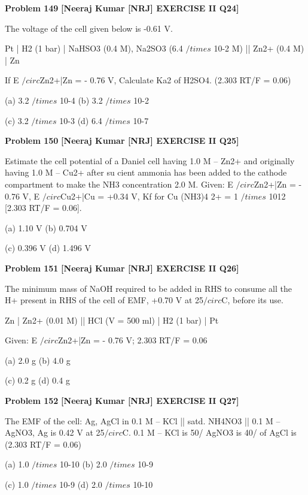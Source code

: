 \begin{problembox}
\textbf{Problem 149} \hfill \textbf{[Neeraj Kumar [NRJ] EXERCISE II Q24]}
\label{q:ext-nrj_all_questions-149}

The voltage of the cell given below is -0.61 V.
 
   Pt | H2 (1 bar) | NaHSO3 (0.4 M), Na2SO3 
(6.4 $/times$ 10-2 M) || Zn2+ (0.4 M) | Zn
 
  If E $/circ$Zn2+|Zn = - 0.76 V, Calculate Ka2 of H2SO4. 
(2.303 RT/F = 0.06)
 
 (a) 3.2 $/times$ 10-4 
(b) 3.2 $/times$ 10-2
 
 (c) 3.2 $/times$ 10-3 
(d) 6.4 $/times$ 10-7
\end{problembox}

\begin{problembox}
\textbf{Problem 150} \hfill \textbf{[Neeraj Kumar [NRJ] EXERCISE II Q25]}
\label{q:ext-nrj_all_questions-150}

Estimate the cell potential of a Daniel cell having 
1.0 M -- Zn2+ and originally having 1.0 M -- 
Cu2+ after su   cient ammonia has been added 
to the cathode compartment to make the NH3 
concentration 2.0 M. Given: E $/circ$Zn2+|Zn = - 0.76 V, 
E $/circ$Cu2+|Cu = +0.34 V, Kf for Cu (NH3)4
2+ = 1 $/times$ 1012 
[2.303 RT/F = 0.06].
 
 (a) 1.10 V 
(b) 0.704 V
 
 (c) 0.396 V 
(d) 1.496 V
\end{problembox}

\begin{problembox}
\textbf{Problem 151} \hfill \textbf{[Neeraj Kumar [NRJ] EXERCISE II Q26]}
\label{q:ext-nrj_all_questions-151}

The minimum mass of NaOH required to be 
added in RHS to consume all the H+ present in 
RHS of the cell of EMF, +0.70 V at 25$/circ$C, before 
its use.
 
   Zn | Zn2+ (0.01 M) || HCl (V = 500 ml) | H2 
(1 bar) | Pt
 
  Given: E $/circ$Zn2+|Zn = - 0.76 V; 2.303 RT/F = 0.06
 
 (a) 2.0 g 
(b) 4.0 g
 
 (c) 0.2 g 
(d) 0.4 g
\end{problembox}

\begin{problembox}
\textbf{Problem 152} \hfill \textbf{[Neeraj Kumar [NRJ] EXERCISE II Q27]}
\label{q:ext-nrj_all_questions-152}

The EMF of the cell: Ag, AgCl in 0.1 M -- KCl || 
satd. NH4NO3 || 0.1 M -- AgNO3, Ag is 0.42 V at 
25$/circ$C. 0.1 M -- KCl is 50/%
AgNO3 is 40/%
of AgCl is (2.303 RT/F = 0.06)
 
 (a) 1.0 $/times$ 10-10 
(b) 2.0 $/times$ 10-9
 
 (c) 1.0 $/times$ 10-9 
(d) 2.0 $/times$ 10-10
\end{problembox}

